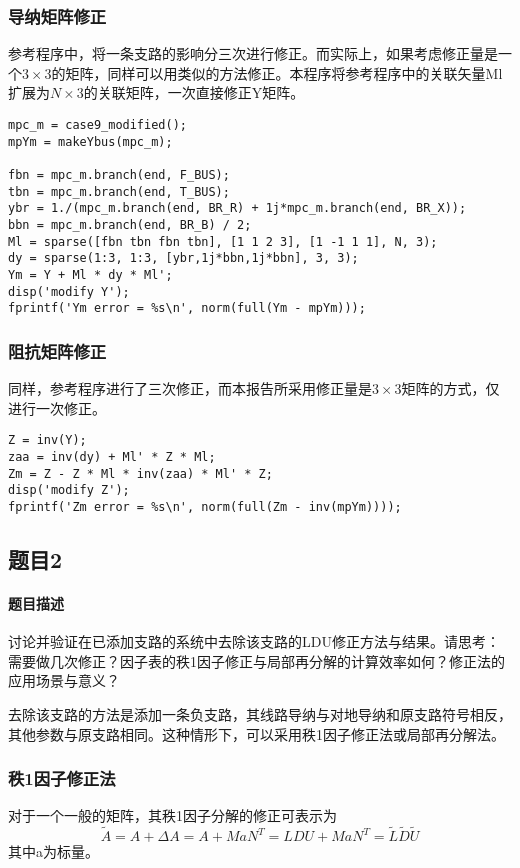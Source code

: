 \documentclass[a4paper,12pt]{article}
\begin{document}
    \subsubsection{导纳矩阵修正}
    参考程序中，将一条支路的影响分三次进行修正。而实际上，如果考虑修正量是一个$3\times 3$的矩阵，同样可以用类似的方法修正。本程序将参考程序中的关联矢量Ml扩展为$N\times 3$的关联矩阵，一次直接修正Y矩阵。

    \begin{lstlisting}[style=Matlab-editor,basicstyle=\mlttfamily,label=lst:q2q1p1,caption={导纳矩阵修正程序}]
%% Modify Y
mpc_m = case9_modified();
mpYm = makeYbus(mpc_m);

fbn = mpc_m.branch(end, F_BUS);
tbn = mpc_m.branch(end, T_BUS);
ybr = 1./(mpc_m.branch(end, BR_R) + 1j*mpc_m.branch(end, BR_X));
bbn = mpc_m.branch(end, BR_B) / 2;
Ml = sparse([fbn tbn fbn tbn], [1 1 2 3], [1 -1 1 1], N, 3);
dy = sparse(1:3, 1:3, [ybr,1j*bbn,1j*bbn], 3, 3);
Ym = Y + Ml * dy * Ml';
disp('modify Y');
fprintf('Ym error = %s\n', norm(full(Ym - mpYm)));
    \end{lstlisting}
    \subsubsection{阻抗矩阵修正}
    同样，参考程序进行了三次修正，而本报告所采用修正量是$3\times 3$矩阵的方式，仅进行一次修正。
    \begin{lstlisting}[style=Matlab-editor,basicstyle=\mlttfamily,label=lst:q2q1p2,caption={阻抗矩阵修正程序}]
%% Modify Z
Z = inv(Y);
zaa = inv(dy) + Ml' * Z * Ml;
Zm = Z - Z * Ml * inv(zaa) * Ml' * Z;
disp('modify Z');
fprintf('Zm error = %s\n', norm(full(Zm - inv(mpYm))));
    \end{lstlisting}
    \subsection{题目2}
    \paragraph{题目描述} 讨论并验证在已添加支路的系统中去除该支路的LDU修正方法与结果。请思考：需要做几次修正？因子表的秩1因子修正与局部再分解的计算效率如何？修正法的应用场景与意义？

    去除该支路的方法是添加一条负支路，其线路导纳与对地导纳和原支路符号相反，其他参数与原支路相同。这种情形下，可以采用秩1因子修正法或局部再分解法。

    \subsubsection{秩1因子修正法}
    对于一个一般的矩阵，其秩1因子分解的修正可表示为
    \begin{equation}
      \label{eq:r1eq}
      \widetilde A = A + \Delta A = A + MaN^T = LDU + MaN^T = \widetilde L \widetilde D \widetilde U
    \end{equation}
    其中a为标量。
\end{document}
